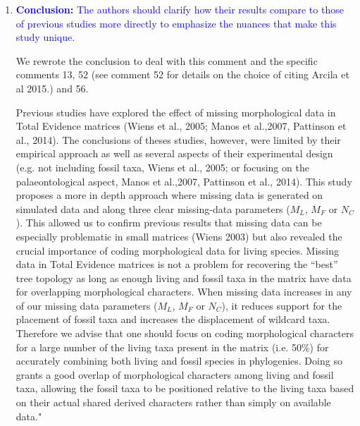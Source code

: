 \documentclass[12pt,letterpaper]{article}
\begin{document}
\begin{enumerate}
\item{\textcolor{blue}{\textbf{Conclusion:} The authors should clarify how their results compare to those of previous studies more directly to emphasize the nuances that make this study unique. }}

We rewrote the conclusion to deal with this comment and the specific comments 13, 52 (see comment 52 for details on the choice of citing Arcila et al 2015.) and 56.


Previous studies have explored the effect of missing morphological data in Total Evidence matrices (Wiens et al., 2005; Manos et al.,2007, Pattinson et al., 2014).
The conclusions of theses studies, however, were limited by their empirical approach as well as several aspects of their experimental design (e.g. not including fossil taxa, Wiens et al., 2005; or focusing on the palaeontological aspect, Manos et al.,2007, Pattinson et al., 2014).
%
This study proposes a more in depth approach where missing data is generated on simulated data and along three clear missing-data parameters ($M_{L}$, $M_{F}$ or $N_{C}$).
This allowed us to confirm previous results that missing data can be especially problematic in small matrices (Wiens 2003) but also revealed the crucial importance of coding morphological data for living species.
Missing data in Total Evidence matrices is not a problem for recovering the ``best'' tree topology as long as enough living and fossil taxa in the matrix have data for overlapping morphological characters.
When missing data increases in any of our missing data parameters ($M_{L}$, $M_{F}$ or $N_{C}$), it reduces support for the placement of fossil taxa and increases the displacement of wildcard taxa.
Therefore we advise that one should focus on coding morphological characters for a large number of the living taxa present in the matrix (i.e. 50\%) for accurately combining both living and fossil species in phylogenies.
Doing so grants a good overlap of morphological characters among living and fossil taxa, allowing the fossil taxa to be positioned relative to the living taxa based on their actual shared derived characters rather than simply on available data."


\end{enumerate}
\end{document}
